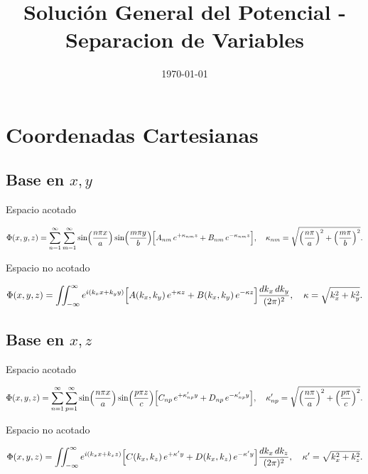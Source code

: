 \documentclass[12pt,a4paper]{article}
\title{Solución General del Potencial - Separacion de Variables}
\author{ }
\date{\today}
\begin{document}
\maketitle

\section{Coordenadas Cartesianas}

\subsection{Base en $x,y$}

Espacio acotado 

\begin{equation}
\Phi(x,y,z)
=\sum_{n=1}^{\infty}\sum_{m=1}^{\infty}
\sin\Bigl(\frac{n\pi x}{a}\Bigr)
\sin\Bigl(\frac{m\pi y}{b}\Bigr)
\Bigl[
A_{nm}\,e^{+\kappa_{nm}z}
+ B_{nm}\,e^{-\kappa_{nm}z}
\Bigr],
\quad
\kappa_{nm}
=\sqrt{\Bigl(\frac{n\pi}{a}\Bigr)^{2}+\Bigl(\frac{m\pi}{b}\Bigr)^{2}}.
\end{equation}


Espacio no acotado

\begin{equation}
\Phi(x,y,z)
=\iint_{-\infty}^{\infty}
 e^{i(k_x x + k_y y)}
\Bigl[
A(k_x,k_y)\,e^{+\kappa z}
+ B(k_x,k_y)\,e^{-\kappa z}
\Bigr]
\frac{dk_x\,dk_y}{(2\pi)^2},
\quad
\kappa=\sqrt{k_x^2+k_y^2}.
\end{equation}

\subsection{Base en $x,z$}


Espacio acotado

\begin{equation}
\Phi(x,y,z)
=\sum_{n=1}^{\infty}\sum_{p=1}^{\infty}
\sin\Bigl(\frac{n\pi x}{a}\Bigr)
\sin\Bigl(\frac{p\pi z}{c}\Bigr)
\Bigl[
C_{np}\,e^{+\kappa'_{np}y}
+ D_{np}\,e^{-\kappa'_{np}y}
\Bigr],
\quad
\kappa'_{np}
=\sqrt{\Bigl(\frac{n\pi}{a}\Bigr)^{2}+\Bigl(\frac{p\pi}{c}\Bigr)^{2}}.
\end{equation}


Espacio no acotado

\begin{equation}
\Phi(x,y,z)
=\iint_{-\infty}^{\infty}
 e^{i(k_x x + k_z z)}
\Bigl[
C(k_x,k_z)\,e^{+\kappa' y}
+ D(k_x,k_z)\,e^{-\kappa' y}
\Bigr]
\frac{dk_x\,dk_z}{(2\pi)^2},
\quad
\kappa'=\sqrt{k_x^2+k_z^2}.
\end{equation}
\end{document}
